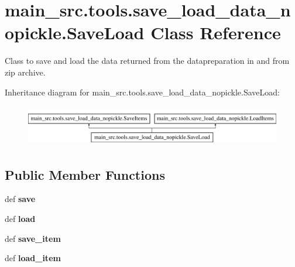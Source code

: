 \hypertarget{classmain__src_1_1tools_1_1save__load__data__nopickle_1_1SaveLoad}{\section{main\-\_\-src.\-tools.\-save\-\_\-load\-\_\-data\-\_\-nopickle.\-Save\-Load Class Reference}
\label{classmain__src_1_1tools_1_1save__load__data__nopickle_1_1SaveLoad}
}


Class to save and load the data returned from the datapreparation in and from zip archive.  


Inheritance diagram for main\-\_\-src.\-tools.\-save\-\_\-load\-\_\-data\-\_\-nopickle.\-Save\-Load\-:\begin{figure}[H]
\begin{center}
\leavevmode
\includegraphics[height=1.812298cm]{classmain__src_1_1tools_1_1save__load__data__nopickle_1_1SaveLoad}
\end{center}
\end{figure}
\subsection*{Public Member Functions}
\begin{DoxyCompactItemize}
\item 
\hypertarget{classmain__src_1_1tools_1_1save__load__data__nopickle_1_1SaveLoad_a1235e273ddc9bf9f59a98aa88ced0986}{def {\bfseries save}}\label{classmain__src_1_1tools_1_1save__load__data__nopickle_1_1SaveLoad_a1235e273ddc9bf9f59a98aa88ced0986}

\item 
\hypertarget{classmain__src_1_1tools_1_1save__load__data__nopickle_1_1SaveLoad_a2e9839c68458e87cd479ad8f387a9cef}{def {\bfseries load}}\label{classmain__src_1_1tools_1_1save__load__data__nopickle_1_1SaveLoad_a2e9839c68458e87cd479ad8f387a9cef}

\item 
\hypertarget{classmain__src_1_1tools_1_1save__load__data__nopickle_1_1SaveLoad_a8c50268baf5dcb69d2698b4fae95268a}{def {\bfseries save\-\_\-item}}\label{classmain__src_1_1tools_1_1save__load__data__nopickle_1_1SaveLoad_a8c50268baf5dcb69d2698b4fae95268a}

\item 
\hypertarget{classmain__src_1_1tools_1_1save__load__data__nopickle_1_1SaveLoad_ad8ff3902c8bf8612703696579fed4bbf}{def {\bfseries load\-\_\-item}}\label{classmain__src_1_1tools_1_1save__load__data__nopickle_1_1SaveLoad_ad8ff3902c8bf8612703696579fed4bbf}

\end{DoxyCompactItemize}
